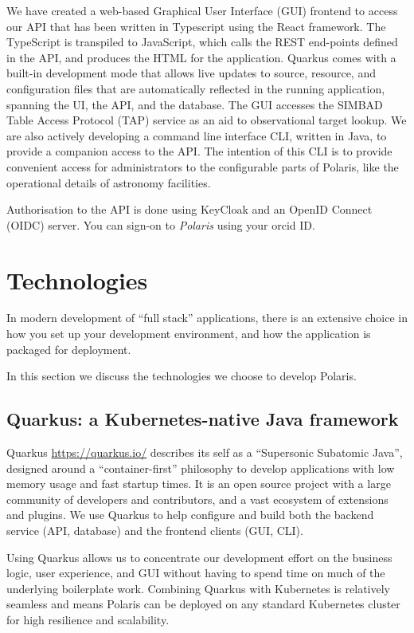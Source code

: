 \documentclass[11pt,twoside]{article}
\begin{document}
We have created a web-based Graphical User Interface (GUI) frontend to access our API that has been
written in Typescript using the React framework.
The TypeScript is transpiled to JavaScript, which calls the REST end-points defined in the API, and produces the
HTML for the application.
Quarkus comes with a built-in development mode that allows live updates to source, resource, and
configuration files that are automatically reflected in the running application, spanning the UI, the API,
and the database.
The GUI accesses the SIMBAD Table Access Protocol (TAP) service as an aid to observational target lookup.
We are also actively developing a command line interface CLI, written in Java, to provide a companion access to
the API. The intention of this CLI is to provide convenient access for administrators to the configurable parts of
Polaris, like the operational details of astronomy facilities.

Authorisation to the API is done using KeyCloak and an OpenID Connect (OIDC) server.
You can sign-on to \emph{Polaris} using your orcid ID\@.


\section{Technologies}\label{sec:technologies}

In modern development of ``full stack'' applications, there is an extensive choice in how you set up your
development environment, and how the application is packaged for deployment.

In this section we discuss the technologies we choose to develop Polaris.

\subsection{Quarkus: a Kubernetes-native Java framework}\label{subsec:quarkus}

Quarkus \url{https://quarkus.io/} describes its self as a ``Supersonic Subatomic Java'', designed around a
``container-first'' philosophy to develop applications with low memory usage and fast startup times.
It is an open source project with a large community of developers and contributors, and a vast ecosystem
of extensions and plugins.
We use Quarkus to help configure and build both the backend service (API, database) and the frontend clients
(GUI, CLI).

Using Quarkus allows us to concentrate our development effort on the business logic, user experience, and GUI
without having to spend time on much of the underlying boilerplate work.
Combining Quarkus with Kubernetes is relatively seamless and means Polaris can be deployed on any standard
Kubernetes cluster for high resilience and scalability.
\end{document}
